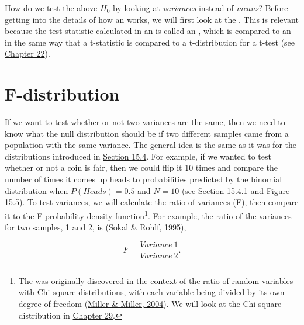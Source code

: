 \documentclass[
  openany]{krantz}
\begin{document}
How do we test the above \(H_{0}\) by looking at \emph{variances} instead of \emph{means}?
Before getting into the details of how an  works, we will first look at the .
This is relevant because the test statistic calculated in an  is called an , which is compared to an  in the same way that a t-statistic is compared to a t-distribution for a t-test (see \protect\hyperlink{Chapter_22}{Chapter 22}).

\hypertarget{f-distribution}{%
\section{F-distribution}\label{f-distribution}}

If we want to test whether or not two variances are the same, then we need to know what the null distribution should be if two different samples came from a population with the same variance.
The general idea is the same as it was for the distributions introduced in \protect\hyperlink{probability-distributions}{Section 15.4}.
For example, if we wanted to test whether or not a coin is fair, then we could flip it 10 times and compare the number of times it comes up heads to probabilities predicted by the binomial distribution when \(P(Heads) = 0.5\) and \(N = 10\) (see \protect\hyperlink{binomial-distribution}{Section 15.4.1} and Figure 15.5).
To test variances, we will calculate the ratio of variances (F), then compare it to the F probability density function\footnote{The  was originally discovered in the context of the ratio of random variables with Chi-square distributions, with each variable being divided by its own degree of freedom (\protect\hyperlink{ref-Miller2004}{Miller \& Miller, 2004}). We will look at the Chi-square distribution in \protect\hyperlink{Chapter_29}{Chapter 29}.}.
For example, the ratio of the variances for two samples, 1 and 2, is (\protect\hyperlink{ref-Sokal1995}{Sokal \& Rohlf, 1995}),

\[F = \frac{Variance\:1}{Variance\:2}.\]
\end{document}
